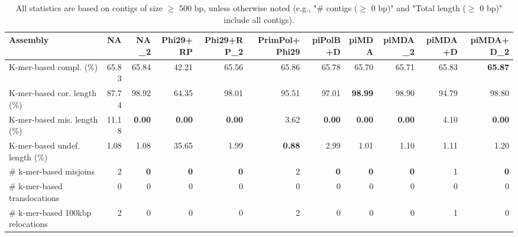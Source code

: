 \documentclass[12pt,a4paper]{article}
\begin{document}
\begin{table}[ht]
\begin{center}
\caption{All statistics are based on contigs of size $\geq$ 500 bp, unless otherwise noted (e.g., "\# contigs ($\geq$ 0 bp)" and "Total length ($\geq$ 0 bp)" include all contigs).}
\begin{tabular}{|l*{10}{|r}|}
\hline
Assembly & NA & NA\_2 & Phi29+RP & Phi29+RP\_2 & PrimPol+Phi29 & piPolB+D & piMDA & piMDA\_2 & piMDA+D & piMDA+D\_2 \\ \hline
K-mer-based compl. (\%) & 65.83 & 65.84 & 42.21 & 65.56 & 65.86 & 65.78 & 65.70 & 65.71 & 65.83 & {\bf 65.87} \\ \hline
K-mer-based cor. length (\%) & 87.74 & 98.92 & 64.35 & 98.01 & 95.51 & 97.01 & {\bf 98.99} & 98.90 & 94.79 & 98.80 \\ \hline
K-mer-based mis. length (\%) & 11.18 & {\bf 0.00} & {\bf 0.00} & {\bf 0.00} & 3.62 & {\bf 0.00} & {\bf 0.00} & {\bf 0.00} & 4.10 & {\bf 0.00} \\ \hline
K-mer-based undef. length (\%) & 1.08 & 1.08 & 35.65 & 1.99 & {\bf 0.88} & 2.99 & 1.01 & 1.10 & 1.11 & 1.20 \\ \hline
\# k-mer-based misjoins & 2 & {\bf 0} & {\bf 0} & {\bf 0} & 2 & {\bf 0} & {\bf 0} & {\bf 0} & 1 & {\bf 0} \\ \hline
\hspace{5mm}\# k-mer-based translocations & 0 & 0 & 0 & 0 & 0 & 0 & 0 & 0 & 0 & 0 \\ \hline
\hspace{5mm}\# k-mer-based 100kbp relocations & 2 & 0 & 0 & 0 & 2 & 0 & 0 & 0 & 1 & 0 \\ \hline
\end{tabular}
\end{center}
\end{table}
\end{document}
